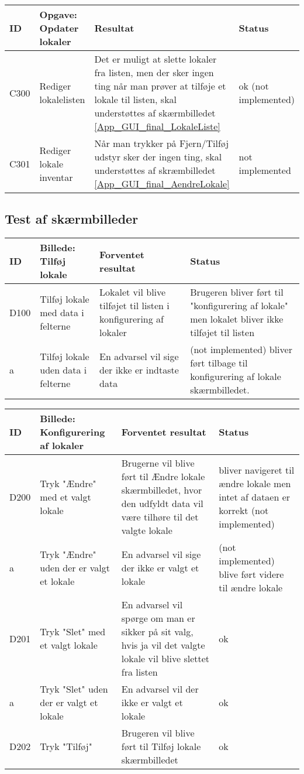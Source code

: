 \begin{tabularx}{\textwidth}{ |X|X|X|X| }
\hline
	ID & Opgave: Opdater lokaler & Resultat & Status\\ 
\hline
	C300 & Rediger lokalelisten & Det er muligt at slette lokaler fra listen, men der sker ingen ting når man prøver at tilføje et lokale til listen, skal understøttes af skærmbilledet \ref{App_GUI_final_LokaleListe} & ok (not implemented) \\
\hline
	C301 & Rediger lokale inventar & Når man trykker på Fjern/Tilføj udstyr sker der ingen ting, skal understøttes af skræmbilledet \ref{App_GUI_final_AendreLokale} & not implemented \\
\hline
\end{tabularx}


\subsection{Test af skærmbilleder}
 \label{App_Test_ListOfTest_ScreenTests}

\begin{tabularx}{\textwidth}{ |X|X|X|X| }
\hline
	ID & Billede: Tilføj lokale  & Forventet resultat & Status\\ 
\hline
	D100 &Tilføj lokale med data i felterne & Lokalet vil blive tilføjet til listen i konfigurering af lokaler & Brugeren bliver ført til "konfigurering af lokale" men lokalet bliver ikke tilføjet til listen \\
\hline
	a & Tilføj lokale uden data i felterne  & En advarsel vil sige der ikke er indtaste data &(not implemented) bliver ført tilbage til konfigurering af lokale skærmbilledet. \\
\hline
\end{tabularx}

\begin{tabularx}{\textwidth}{ |X|X|X|X| }
\hline
	ID & Billede: Konfigurering af lokaler & Forventet resultat & Status\\ 
\hline
	D200 & Tryk "Ændre" med et valgt lokale & Brugerne vil blive ført til Ændre lokale skærmbilledet, hvor den udfyldt data vil være tilhøre til det valgte lokale & bliver navigeret til ændre lokale men intet af dataen er korrekt (not implemented) \\
\hline
	a & Tryk "Ændre" uden der er valgt et lokale & En advarsel vil sige der ikke er valgt et lokale & (not implemented) blive ført videre til ændre lokale \\
\hline
	D201 & Tryk "Slet" med et valgt lokale &En advarsel vil spørge om man er sikker på sit valg, hvis ja vil det valgte lokale vil blive slettet fra listen & ok \\
\hline
	a & Tryk "Slet" uden der er valgt et lokale & En advarsel vil der ikke er valgt et lokale & ok \\
\hline
	D202 & Tryk "Tilføj" & Brugeren vil blive ført til Tilføj lokale skærmbilledet & ok\\
\hline
\end{tabularx}

